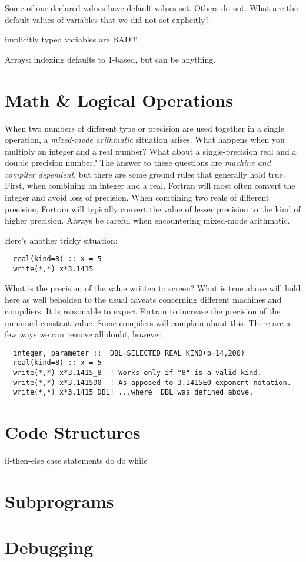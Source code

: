 \documentclass[11pt, letterpaper]{article}
\begin{document}
Some of our declared values have default values set.  Others do not.  What
are the default values of variables that we did not set explicitly?

implicitly typed variables are BAD!!!

Arrays: indexing defaults to 1-based, but can be anything.

\section{Math \& Logical Operations}

When two numbers of different type or precision are used together in a single
operation, a \emph{mixed-mode arithmatic} situation arises.  What happens when
you multiply an integer and a real number?  What about a single-precision
real and a double precision number?  The answer to these questions are
\emph{machine and compiler dependent}, but there are some ground rules that
generally hold true.  First, when combining an integer and a real, Fortran
will most often convert the integer and avoid loss of precision.  When
combining two reals of different precision, Fortran will typically convert the
value of lesser precision to the kind of higher precision.  Always be
careful when encountering mixed-mode arithmatic.

Here's another tricky situation:
\begin{verbatim}
  real(kind=8) :: x = 5
  write(*,*) x*3.1415
\end{verbatim}
What is the precision of the value written to screen?  What is true above
will hold here as well beholden to the usual caveats concerning different
machines and compiliers.  It is reasonable to expect Fortran to increase the
precision of the unnamed constant value.  Some compilers will complain about
this.  There are a few ways we can remove all doubt, however.
\begin{verbatim}
  integer, parameter :: _DBL=SELECTED_REAL_KIND(p=14,200)
  real(kind=8) :: x = 5
  write(*,*) x*3.1415_8  ! Works only if "8" is a valid kind.
  write(*,*) x*3.1415D0  ! As apposed to 3.1415E0 exponent notation.
  write(*,*) x*3.1415_DBL! ...where _DBL was defined above.
\end{verbatim}

\section{Code Structures}

if-then-else
case statements
do
do while


\section{Subprograms}

\section{Debugging}
\end{document}
